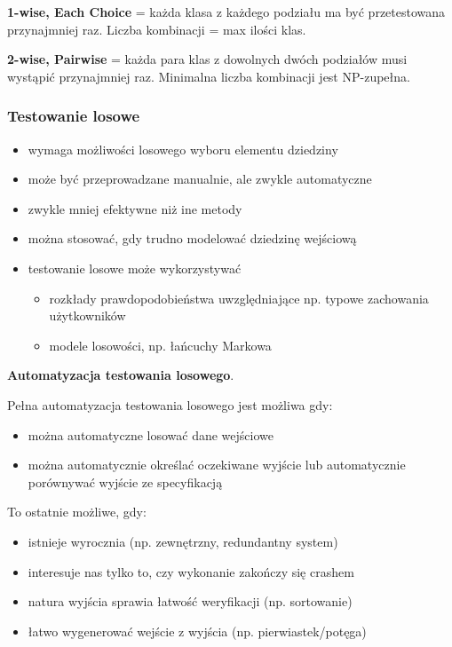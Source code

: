 \documentclass[../main.tex]{subfiles}
\begin{document}
    \textbf{1-wise, Each Choice} = każda klasa z każdego podziału ma być przetestowana przynajmniej raz.
    Liczba kombinacji = max ilości klas.

    \textbf{2-wise, Pairwise} = każda para klas z dowolnych dwóch podziałów musi wystąpić przynajmniej raz. Minimalna
    liczba kombinacji jest NP-zupełna.


    \subsubsection{Testowanie losowe}
    \begin{itemize}
        \item wymaga możliwości losowego wyboru elementu dziedziny
        \item może być przeprowadzane manualnie, ale zwykle automatyczne
        \item zwykle mniej efektywne niż ine metody
        \item można stosować, gdy trudno modelować dziedzinę wejściową
        \item testowanie losowe może wykorzystywać
        \begin{itemize}
            \item rozkłady prawdopodobieństwa uwzględniające np. typowe
            zachowania użytkowników
            \item modele losowości, np. łańcuchy Markowa
        \end{itemize}
    \end{itemize}

    \textbf{Automatyzacja testowania losowego}.

    Pełna automatyzacja testowania losowego jest możliwa gdy:
    \begin{itemize}
        \item można automatyczne losować dane wejściowe
        \item można automatycznie określać oczekiwane wyjście lub automatycznie porównywać wyjście ze specyfikacją
    \end{itemize}

    To ostatnie możliwe, gdy:
    \begin{itemize}
        \item istnieje wyrocznia (np. zewnętrzny, redundantny system)
        \item interesuje nas tylko to, czy wykonanie zakończy się crashem
        \item natura wyjścia sprawia łatwość weryfikacji (np. sortowanie)
        \item łatwo wygenerować wejście z wyjścia (np. pierwiastek/potęga)
    \end{itemize}
\end{document}
